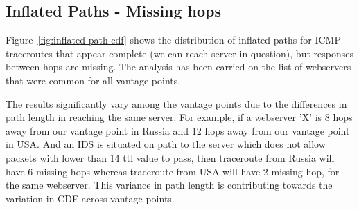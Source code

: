 \subsection{Inflated Paths - Missing hops}
Figure~\ref{fig:inflated-path-cdf} shows the distribution of inflated paths for ICMP traceroutes that appear complete (we can reach server in question), but responses between hops are missing. The analysis has been carried on the list of webservers that were common for all vantage points.

The results significantly vary among the vantage points due to the differences in path length in reaching the same server. For example, if a webserver 'X' is 8 hops away from our vantage point in Russia and 12 hops away from our vantage point in USA. And an IDS is situated on path to the server which does not allow packets with lower than 14 ttl value to pass, then traceroute from Russia  will have 6 missing hops whereas traceroute from USA will have 2 missing hop, for the same webserver. This variance in path length is contributing towards the variation in CDF across vantage points.


\newpage


